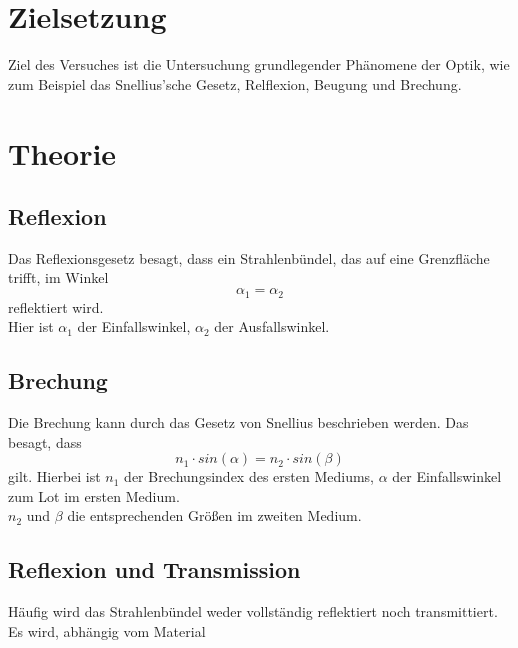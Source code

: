 \section{Zielsetzung}
Ziel des Versuches ist die Untersuchung grundlegender Phänomene der Optik, wie zum Beispiel 
das Snellius'sche Gesetz, Relflexion, Beugung und Brechung.\\



\section{Theorie}
\label{sec:Theorie}

\subsection*{Reflexion}
Das Reflexionsgesetz besagt, dass ein Strahlenbündel, das auf eine Grenzfläche trifft, im Winkel
\begin{equation*}
    \alpha_1 = \alpha_2
\end{equation*}
reflektiert wird.\\
Hier ist $\alpha_1$ der Einfallswinkel, $\alpha_2$ der Ausfallswinkel.\\

\subsection*{Brechung}
Die Brechung kann durch das Gesetz von Snellius beschrieben werden. Das besagt, dass
\begin{equation*}
    n_1 \cdot sin(\alpha) = n_2 \cdot sin(\beta)
\end{equation*}
gilt. Hierbei ist $n_1$ der Brechungsindex des ersten Mediums, $\alpha$ der Einfallswinkel zum Lot im ersten Medium.\\
$n_2$ und $\beta$ die entsprechenden Größen im zweiten Medium.\\


\subsection*{Reflexion und Transmission}
Häufig wird das Strahlenbündel weder vollständig reflektiert noch transmittiert.\\
Es wird, abhängig vom Material 